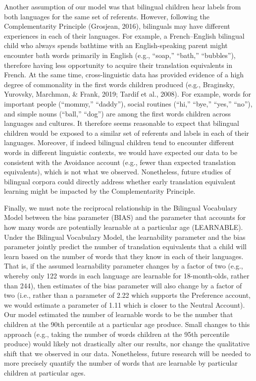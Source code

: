 \documentclass[
  english,
  ,man,floatsintext]{apa6}
\begin{document}
Another assumption of our model was that bilingual children hear labels from both languages for the same set of referents. However, following the Complementarity Principle (Grosjean, 2016), bilinguals may have different experiences in each of their languages. For example, a French--English bilingual child who always spends bathtime with an English-speaking parent might encounter bath words primarily in English (e.g., ``soap,'' ``bath,'' ``bubbles''), therefore having less opportunity to acquire their translation equivalents in French. At the same time, cross-linguistic data has provided evidence of a high degree of commonality in the first words children produced (e.g., Braginsky, Yurovsky, Marchman, \& Frank, 2019; Tardif et al., 2008). For example, words for important people (``mommy,'' ``daddy''), social routines (``hi,'' ``bye,'' ``yes,'' ``no''), and simple nouns (``ball,'' ``dog'') are among the first words children across languages and cultures. It therefore seems reasonable to expect that bilingual children would be exposed to a similar set of referents and labels in each of their languages. Moreover, if indeed bilingual children tend to encounter different words in different linguistic contexts, we would have expected our data to be consistent with the Avoidance account (e.g., fewer than expected translation equivalents), which is not what we observed. Nonetheless, future studies of bilingual corpora could directly address whether early translation equivalent learning might be impacted by the Complementarity Principle.

Finally, we must note the reciprocal relationship in the Bilingual Vocabulary Model between the bias parameter (BIAS) and the parameter that accounts for how many words are potentially learnable at a particular age (LEARNABLE). Under the Bilingual Vocabulary Model, the learnability parameter and the bias parameter jointly predict the number of translation equivalents that a child will learn based on the number of words that they know in each of their languages. That is, if the assumed learnability parameter changes by a factor of two (e.g., whereby only 122 words in each language are learnable for 18-month-olds, rather than 244), then estimates of the bias parameter will also change by a factor of two (i.e., rather than a parameter of 2.22 which supports the Preference account, we would estimate a parameter of 1.11 which is closer to the Neutral Account). Our model estimated the number of learnable words to be the number that children at the 90th percentile at a particular age produce. Small changes to this approach (e.g., taking the number of words children at the 95th percentile produce) would likely not drastically alter our results, nor change the qualitative shift that we observed in our data. Nonetheless, future research will be needed to more precisely quantify the number of words that are learnable by particular children at particular ages.
\end{document}

